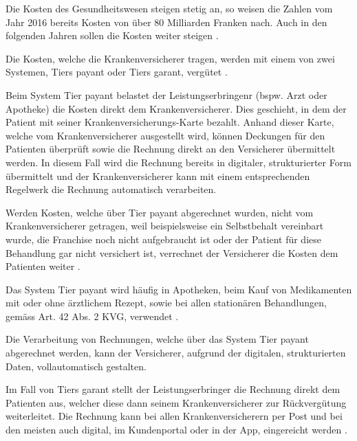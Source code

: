\documentclass[12pt, twoside, table]{extarticle}
\begin{document}
Die Kosten des Gesundheitswesen steigen stetig an, so weisen die Zahlen vom Jahr 2016 bereits Kosten von über 80 Milliarden Franken nach. Auch in den folgenden Jahren sollen die Kosten weiter steigen  \cite{BundesamtfurStatistik2018Finanzierung}.

Die Kosten, welche die Krankenversicherer tragen, werden mit einem von zwei Systemen, Tiers payant oder Tiers garant, vergütet \cite{EidgenossischesDepartementdesInnern2017FaktenblattVergutungssysteme}. 

Beim System Tier payant belastet der Leistungserbringenr (bspw. Arzt oder Apotheke) die Kosten direkt dem Krankenversicherer. Dies geschieht, in dem der Patient mit seiner Kranken\-versicherungs-Karte bezahlt. Anhand dieser Karte, welche vom Krankenversicherer ausgestellt wird, können Deckungen für den Patienten überprüft sowie die Rechnung direkt an den Versicherer übermittelt werden. In diesem Fall wird die Rechnung bereits in digitaler, strukturierter Form übermittelt und der Krankenversicherer kann mit einem entsprechenden Regelwerk die Rechnung automatisch verarbeiten. 

Werden Kosten, welche über Tier payant abgerechnet wurden, nicht vom Krankenversicherer getragen, weil beispielsweise ein Selbstbehalt vereinbart wurde, die Franchise noch nicht aufgebraucht ist oder der Patient für diese Behandlung gar nicht versichert ist, verrechnet der Versicherer die Kosten dem Patienten weiter \cite{EidgenossischesDepartementdesInnern2017FaktenblattVergutungssysteme}.

Das System Tier payant wird häufig in Apotheken, beim Kauf von Medikamenten mit oder ohne ärztlichem Rezept, sowie bei allen stationären Behandlungen, gemäss Art. 42 Abs. 2 KVG, verwendet \cite{EidgenossischesDepartementdesInnern2017FaktenblattVergutungssysteme}.

Die Verarbeitung von Rechnungen, welche über das System Tier payant abgerechnet werden, kann der Versicherer, aufgrund der digitalen, strukturierten Daten, vollautomatisch gestalten.

Im Fall von Tiers garant stellt der Leistungserbringer die Rechnung direkt dem Patienten aus, welcher diese dann seinem Krankenversicherer zur Rückvergütung weiterleitet. Die Rechnung kann bei allen Krankenversicherern per Post und bei den meisten auch digital, im Kundenportal oder in der App, eingereicht werden \cite{EidgenossischesDepartementdesInnern2017FaktenblattVergutungssysteme} .
\end{document}
